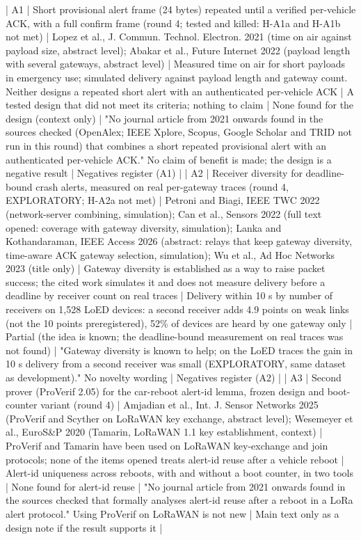 | A1 | Short provisional alert frame (24 bytes) repeated until a verified per-vehicle ACK, with a full confirm frame (round 4; tested and killed: H-A1a and H-A1b not met) | Lopez et al., J. Commun. Technol. Electron. 2021 (time on air against payload size, abstract level); Abakar et al., Future Internet 2022 (payload length with several gateways, abstract level) | Measured time on air for short payloads in emergency use; simulated delivery against payload length and gateway count. Neither designs a repeated short alert with an authenticated per-vehicle ACK | A tested design that did not meet its criteria; nothing to claim | None found for the design (context only) | "No journal article from 2021 onwards found in the sources checked (OpenAlex; IEEE Xplore, Scopus, Google Scholar and TRID not run in this round) that combines a short repeated provisional alert with an authenticated per-vehicle ACK." No claim of benefit is made; the design is a negative result | Negatives register (A1) |
| A2 | Receiver diversity for deadline-bound crash alerts, measured on real per-gateway traces (round 4, EXPLORATORY; H-A2a not met) | Petroni and Biagi, IEEE TWC 2022 (network-server combining, simulation); Can et al., Sensors 2022 (full text opened: coverage with gateway diversity, simulation); Lanka and Kothandaraman, IEEE Access 2026 (abstract: relays that keep gateway diversity, time-aware ACK gateway selection, simulation); Wu et al., Ad Hoc Networks 2023 (title only) | Gateway diversity is established as a way to raise packet success; the cited work simulates it and does not measure delivery before a deadline by receiver count on real traces | Delivery within 10 s by number of receivers on 1,528 LoED devices: a second receiver adds 4.9 points on weak links (not the 10 points preregistered), 52\% of devices are heard by one gateway only | Partial (the idea is known; the deadline-bound measurement on real traces was not found) | "Gateway diversity is known to help; on the LoED traces the gain in 10 s delivery from a second receiver was small (EXPLORATORY, same dataset as development)." No novelty wording | Negatives register (A2) |
| A3 | Second prover (ProVerif 2.05) for the car-reboot alert-id lemma, frozen design and boot-counter variant (round 4) | Amjadian et al., Int. J. Sensor Networks 2025 (ProVerif and Scyther on LoRaWAN key exchange, abstract level); Wesemeyer et al., EuroS\&P 2020 (Tamarin, LoRaWAN 1.1 key establishment, context) | ProVerif and Tamarin have been used on LoRaWAN key-exchange and join protocols; none of the items opened treats alert-id reuse after a vehicle reboot | Alert-id uniqueness across reboots, with and without a boot counter, in two tools | None found for alert-id reuse | "No journal article from 2021 onwards found in the sources checked that formally analyses alert-id reuse after a reboot in a LoRa alert protocol." Using ProVerif on LoRaWAN is not new | Main text only as a design note if the result supports it |


